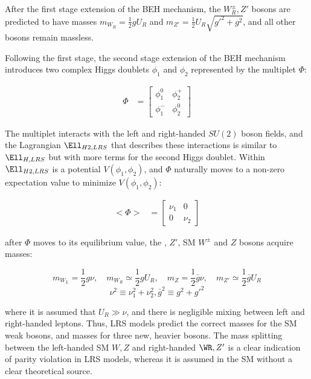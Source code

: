 After the first stage extension of the BEH mechanism, the $W^{\pm}_{R}, Z'$ bosons are predicted to have masses 
$m_{W_{R}} = \frac{1}{2}gU_{R}$ and $m_{Z'} = \frac{1}{2}U_{R}\sqrt{g'^{2} + g^{2}}$, and all other bosons remain 
massless.

Following the first stage, the second stage extension of the BEH mechanism \cite{lrsHiggsStageOne,lrsHiggsStageTwo} 
introduces two complex Higgs doublets $\phi_{1}$ and $\phi_{2}$ represented by the multiplet $\Phi$:

\begin{align}
	\Phi &= \begin{bmatrix}
	\phi^{0}_{1} & \phi^{+}_{2} \\
	\phi^{-}_{1} & \phi^{0}_{2}
	\end{bmatrix}
\end{align}

The multiplet interacts with the left and right-handed $SU(2)$ boson fields, and the Lagrangian $\Ell_{H2,LRS}$ that 
describes these interactions is similar to $\Ell_{H,LRS}$ but with more terms for the second Higgs doublet.  Within 
$\Ell_{H2,LRS}$ is a potential $V(\phi_{1},\phi_{2})$, and $\Phi$ naturally moves to a non-zero expectation 
value to minimize $V(\phi_{1},\phi_{2})$:

\begin{align}
	<\Phi> &= \begin{bmatrix}
	\nu_{1} & 0 \\
	0 & \nu_{2}
	\end{bmatrix}
	\label{eq:stageTwoVEV}
\end{align}

after $\Phi$ moves to its equilibrium value, the \WR, $Z'$, SM $W^{\pm}$ and $Z$ bosons acquire masses:

\begin{equation}
	m_{W_{L}} = \frac{1}{2}g\nu ,\quad m_{W_{R}} \simeq \frac{1}{2}gU_{R} ,\quad m_{Z} = \frac{1}{2}\bar{g}\nu ,\quad m_{Z'} \simeq \frac{1}{2}\bar{g}U_{R}
\end{equation}
\begin{equation}
	\nu^{2} \equiv \nu^{2}_{1} + \nu^{2}_{2} , \bar{g}^{2} \equiv g^{2} + g'^{2}
\end{equation}

where it is assumed that $U_{R} \gg \nu$, and there is negligible mixing between left and right-handed leptons.  
Thus, LRS models predict the correct masses for the SM weak bosons, and masses for three new, heavier bosons.  
The mass splitting between the left-handed SM $W,Z$ and right-handed $\WR,Z'$ is a clear indication of parity 
violation in LRS models, whereas it is assumed in the SM without a clear theoretical source.

